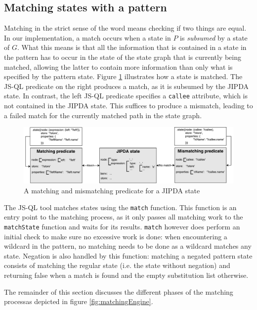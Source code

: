 \subsection{Matching states with a pattern}
\label{subsec:matching}

Matching in the strict sense of the word means checking if two things are equal. In our implementation, a match occurs when a state in $P$ is \textit{subsumed} by a state of $G$. What this means is that all the information that is contained in a state in the pattern has to occur in the state of the state graph that is currently being matched, allowing the latter to contain more information than only what is specified by the pattern state. Figure \ref{fig:matchingPredicates} illustrates how a state is matched. The JS-QL predicate on the right produces a match, as it is subsumed by the JIPDA state. In contrast, the left JS-QL predicate specifies a \texttt{callee} attribute, which is not contained in the JIPDA state. This suffices to produce a mismatch, leading to a failed match for the currently matched path in the state graph.
\begin{figure}[!h]
    \centering
      \includegraphics[width=1\textwidth]{images/matchingPredicates} 
      \caption{A matching and mismatching predicate for a JIPDA state}
    \label{fig:matchingPredicates}
\end{figure}

The JS-QL tool matches states using the \texttt{match} function. This function is an entry point to the matching process, as it only passes all matching work to the \texttt{matchState} function and waits for its results. \texttt{match} however does perform an initial check to make sure no excessive work is done: when encountering a wildcard in the pattern, no matching needs to be done as a wildcard matches any state. Negation is also handled by this function: matching a negated pattern state consists of matching the regular state (i.e. the state without negation) and returning false when a match is found and the empty substitution list otherwise. 

The remainder of this section discusses the different phases of the matching processas depicted in figure \ref{fig:matchingEngine}.



